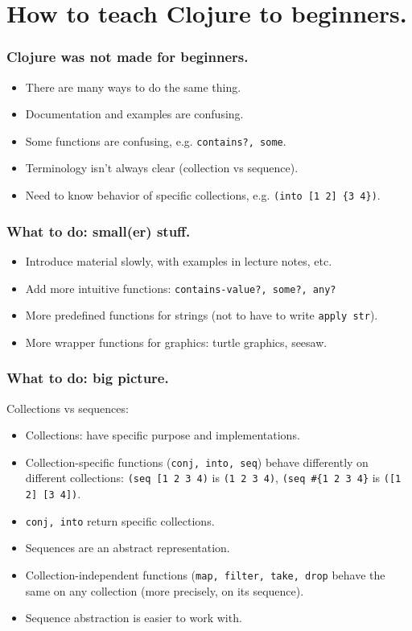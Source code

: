 \documentclass{beamer}
\begin{document}
\section{How to teach Clojure to beginners.}

\begin{frame}
  \frametitle{Clojure was not made for beginners.}
\begin{itemize}
\item There are many ways to do the same thing.
\item Documentation and examples are confusing.
\item Some functions are confusing, e.g. {\tt contains?, some}.
\item Terminology isn't always clear (collection vs sequence).
\item Need to know behavior of specific collections, e.g. {\tt (into [1 2] \{3 4\})}.
\end{itemize}
\end{frame}

\begin{frame}
  \frametitle{What to do: small(er) stuff.}
\begin{itemize}
\item Introduce material slowly, with examples in lecture notes, etc.
\item Add more intuitive functions: {\tt contains-value?, some?, any?}
\item More predefined functions for strings (not to have to write {\tt apply str}).
\item More wrapper functions for graphics: turtle graphics, seesaw. 
\end{itemize}
\end{frame}

\begin{frame}
  \frametitle{What to do: big picture.}
Collections vs sequences:
\begin{itemize}
\item Collections: have specific purpose and implementations. 
\item Collection-specific functions ({\tt conj, into, seq}) behave differently on different collections:
{\tt (seq [1 2 3 4)} is {\tt (1 2 3 4)}, {\tt (seq \#\{1 2 3 4\}} is {\tt ([1 2] [3 4])}. 
\item {\tt conj, into} return specific collections. 
\item Sequences are an abstract representation. 
\item Collection-independent functions ({\tt map, filter, take, drop} behave the same on any collection (more precisely, on its sequence). 
\item Sequence abstraction is easier to work with. 
\end{itemize}
\end{frame}
\end{document}
